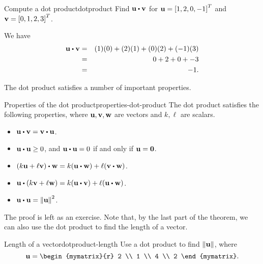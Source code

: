 \begin{example}{Compute a dot product}{dotproduct}
  Find $\vect{u} \dotprod \vect{v}$ for $\mbox{\bf u}=\left[1,2,0,-1\right]^T$
  and $\mbox{\bf v}=\left[0,1,2,3\right]^T$.
\end{example}

\begin{solution}
  We have
  \begin{eqnarray*}
    \vect{u} \dotprod \vect{v}
    &=&
        (1)(0) + (2)(1) + (0)(2) + (-1)(3) \\
    &=&
        0 + 2 + 0 + -3 \\
    &=&
        -1.
  \end{eqnarray*}
\end{solution}

The dot product satisfies a number of important properties. 

\begin{theorem}{Properties of the dot product}{properties-dot-product}
  The dot product satisfies the following properties, where
  $\mbox{\bf u},\mbox{\bf v},\mbox{\bf w}$ are vectors and $k,\ell$ are
  scalars.
  \begin{itemize}
  \item $\vect{u}\dotprod\vect{v}=\vect{v}\dotprod\vect{u}$.
  \item $\vect{u}\dotprod\vect{u}\geq 0$, and $\vect{u}\dotprod\vect{u}=0$ if and only if $\mbox{\bf u}=\mbox{\bf 0}$.
  \item $(k\vect{u}+\ell\vect{v})\dotprod\vect{w}=k(\vect{u}\dotprod\vect{w})+\ell(\vect{v}\dotprod\vect{w})$.
  \item $\vect{u}\dotprod(k\vect{v}+\ell\vect{w})
    =k(\vect{u}\dotprod \vect{v})+\ell(\vect{u}\dotprod\vect{w})$.
  \item $\vect{u}\dotprod\vect{u}=\norm{\vect{u}}^{2}$.
  \end{itemize}
\end{theorem}

The proof is left as an exercise. Note that, by the last part of the
theorem, we can also use the dot product to find the length of a
vector.

\begin{example}{Length of a vector}{dotproduct-length}
  Use a dot product to find $\left\|\mbox{\bf u}\right\|$, where
  \begin{equation*}
    \vect{u}
    =
    \begin{mymatrix}{r}
      2 \\
      1 \\
      4 \\
      2
    \end{mymatrix}.
  \end{equation*}
\end{example}

